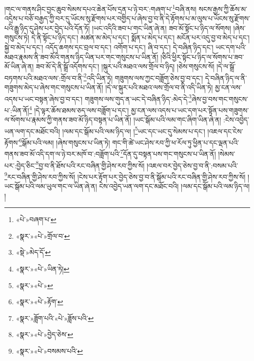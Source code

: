 །གང་ལ་གནས་ཤིང་བྱང་ཆུབ་སེམས་དཔའ་ཆེན་པོས་དྲན་པ་ཉེ་བར་:གཞག་པ་\footnote{«པེ་»བཞག་པ་}བཞི་ནས། སངས་རྒྱས་ཀྱི་ཆོས་མ་འདྲེས་པ་བཅོ་བརྒྱད་ཀྱི་བར་དུ་ཡོངས་སུ་རྫོགས་པར་བགྱིད་པ་ཞེས་བྱ་བ་ནི་དེ་རྟོགས་པ་མ་ལུས་པ་ཡོངས་སུ་རྫོགས་པའི་རྒྱུ་ཉིད་དུ་ཤེས་པར་བྱེད་པའི་དོན་ཏོ། །ཡང་འདིའི་ཟབ་པ་གང་ཡིན་ཞེ་ན། ཟབ་མོ་སྟོང་པ་ཉིད་ལ་སོགས། །ཞེས་གསུངས་ཏེ། དེ་ནི་སྟོང་པ་ཉིད་དང་། མཚན་མ་མེད་པ་དང་། སྨོན་པ་མེད་པ་དང་། མངོན་པར་འདུ་བྱ་བ་མེད་པ་དང་། སྐྱེ་བ་མེད་པ་དང་། འདོད་ཆགས་དང་བྲལ་བ་དང་། འགོག་པ་དང་། ཞི་བ་དང་། དེ་བཞིན་ཉིད་དང་། ཡང་དག་པའི་མཐའ་རྣམས་ནི་ཟབ་མོའི་གནས་ཉིད་ཡིན་པར་གང་གསུངས་པ་ཡིན་ནོ། །ཅིའི་ཕྱིར་སྟོང་པ་ཉིད་ལ་སོགས་པ་ཟབ་མོ་ཡིན་ཞེ་ན། ཟབ་མོ་དེ་ནི་སྒྲོ་འདོགས་དང་། །སྐུར་པའི་མཐའ་ལས་གྲོལ་བ་ཉིད། །ཅེས་གསུངས་སོ། །དེ་ལ་སྒྲོ་བཏགས་པའི་མཐའ་ལས་:གྲོལ་བ་ནི་\footnote{«སྣར་»«པེ་»གྲོལ་བ་}འདི་ཡིན་ཏེ། གཟུགས་ལས་ཀྱང་བཟློག་ཅེས་བྱ་བ་དང་། དེ་བཞིན་ཉིད་ལ་ནི་གཟུགས་མེད་པ་ཞེས་གང་གསུངས་པ་ཡིན་ནོ། །དེ་ལ་སྐུར་པའི་མཐའ་ལས་གྲོལ་བ་ནི་འདི་ཡིན་ཏེ། མྱ་ངན་ལས་འདས་པ་ཡང་བསྟན་ཞེས་བྱ་བ་དང་། གཟུགས་ལས་གུད་ན་ཡང་དེ་བཞིན་ཉིད་:མེད་དེ་\footnote{«སྡེ་»མེད་དོ་}ཞེས་བྱ་བས་གང་གསུངས་པ་:ཡིན་ནོ།\footnote{«སྣར་»«པེ་»ཡིན་ཏེ།} །དེ་ལྟར་ཆོས་ཐམས་ཅད་ལས་བཟློག་པ་དང་། མྱ་ངན་ལས་འདས་པ་ཡང་དག་པར་སྟོན་པས་གཟུགས་ལ་སོགས་པ་རྣམས་ཀྱི་གནས་ཟབ་མོ་ཉིད་བསྟན་པ་ཡིན་ནོ། །ཡང་སྒོམ་པའི་ལམ་གང་ཞིག་ཡིན་ཞེ་ན། :ངེས་འབྱེད་ཡན་ལག་དང་མཐོང་བའི། །ལམ་དང་སྒོམ་པའི་ལམ་ཉིད་ལ། །\footnote{«སྣར་»«པེ་»}ཡང་དང་ཡང་དུ་སེམས་པ་དང་། །འཇལ་དང་ངེས་རྟོགས་\footnote{«སྣར་»«པེ་»རྟོག་}སྒོམ་པའི་ལམ། །ཞེས་གསུངས་པ་ཡིན་ཏེ། གང་གི་ཚེ་ཡང་ཤེས་རབ་ཀྱི་ཕ་རོལ་ཏུ་ཕྱིན་པ་དང་ལྡན་པའི་གནས་ཟབ་མོ་འདི་དག་ལ་ཉེ་བར་མཁོ་བ་:བཟློག་པའི་\footnote{«སྣར་»ཟློག་པའི་«པེ་»ཟློས་པའི་}དོན་དུ་བསྟན་པས་གང་གསུངས་པ་ཡིན་ནོ། །སེམས་པར་:བྱེད་ཅིང་\footnote{«སྣར་»«པེ་»བྱེད་ཅེས་}བྱ་བ་ནི་ཐོས་པའི་རང་བཞིན་གྱི་ཤེས་རབ་ཀྱིས་སོ། །འཇལ་བར་བྱེད་ཅེས་བྱ་བ་ནི་:བསམ་པའི་\footnote{«སྣར་»«པེ་»བསམས་པའི་}རང་བཞིན་གྱི་ཤེས་རབ་ཀྱིས་སོ། །ངེས་པར་རྟོག་པར་བྱེད་ཅེས་བྱ་བ་ནི་སྒོམ་པའི་རང་བཞིན་གྱི་ཤེས་རབ་ཀྱིས་སོ། །ཡང་སྒོམ་པའི་ལམ་ཡུལ་གང་ལ་ཡིན་ཞེ་ན། ངེས་འབྱེད་ཡན་ལག་དང་མཐོང་བའི། །ལམ་དང་སྒོམ་པའི་ལམ་ཉིད་ལ། །
